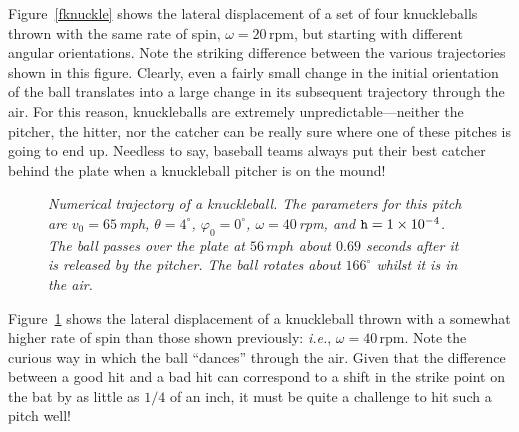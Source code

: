 Figure~\ref{fknuckle} shows the lateral displacement of a set of four knuckleballs
thrown with the same rate of spin, $\omega = 20$\,rpm, but starting with  different
angular orientations. Note the striking difference between
the various trajectories shown in this figure. Clearly, even a fairly small change in the
initial orientation of the ball translates into a large change in its
subsequent trajectory through the air. For this reason, knuckleballs are extremely
unpredictable---neither the pitcher, the hitter, nor the catcher can be really
sure where one of these pitches is going to end up. Needless to say,
baseball teams always put their best catcher behind the plate when a
knuckleball pitcher is on the mound!

\begin{figure}
\epsfysize=3.5in
\centerline{}
\caption{\em Numerical trajectory of  a knuckleball.
The parameters for this pitch are $v_0=65$\,mph, $\theta = 4^\circ$,
$\varphi_0 = 0^\circ$, $\omega = 40$\,rpm, and ${\tt h}=1\times 10^{-4}$. 
The ball passes over the plate at $56\,mph$ about $0.69$ seconds after
it is released by the pitcher. The ball rotates about $166^\circ$ whilst it is
in the air.
 }\label{fknuckle1}
\end{figure}

Figure~\ref{fknuckle1} shows the lateral displacement of a knuckleball
thrown with a somewhat higher rate of spin than those shown previously: {\em i.e.},  $\omega = 40$\,rpm.
Note the curious way in which the ball ``dances'' through the air. Given that the
difference between a good hit and a bad hit can correspond to a shift in the strike point
on the bat by as little as $1/4$ of an inch, it  must be quite a challenge to hit such
a pitch well!
